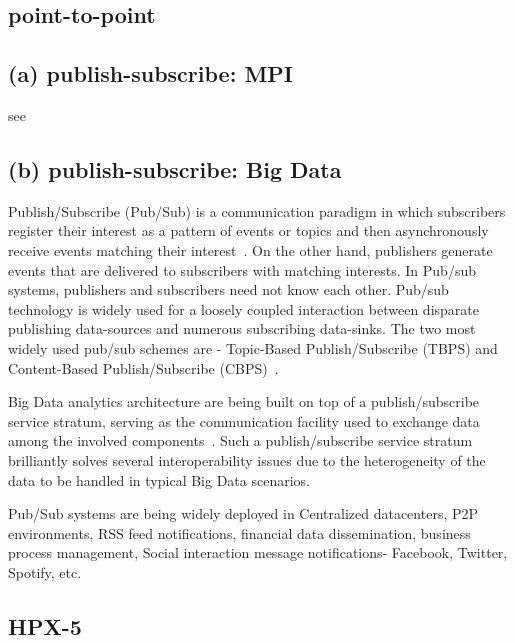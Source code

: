 \subsection{point-to-point}
\subsection{ (a) publish-subscribe: MPI \cv}

     see 
     
\subsection{ (b) publish-subscribe: Big Data}

Publish/Subscribe (Pub/Sub) is a communication paradigm in which
subscribers register their interest as a pattern of events or topics
and then asynchronously receive events matching their
interest~\cite{thesis-pub-sub}.  On the other hand, publishers
generate events that are delivered to subscribers with matching
interests.  In Pub/sub systems, publishers and subscribers need not
know each other. Pub/sub technology is widely used for a loosely
coupled interaction between disparate publishing data-sources and
numerous subscribing data-sinks. The two most widely used pub/sub
schemes are - Topic-Based Publish/Subscribe (TBPS) and Content-Based
Publish/Subscribe (CBPS)~\cite{paper-pub-sub}.
      
Big Data analytics architecture are being built on top of a
publish/subscribe service stratum, serving as the communication
facility used to exchange data among the involved
components~\cite{paper-pub-sub-bigdata}. Such a publish/subscribe
service stratum brilliantly solves several interoperability issues due
to the heterogeneity of the data to be handled in typical Big Data
scenarios.

     Pub/Sub systems are being widely deployed in Centralized
     datacenters, P2P environments, RSS feed notifications, financial
     data dissemination, business process management, Social
     interaction message notifications- Facebook, Twitter, Spotify,
     etc.

     \pv

\subsection{HPX-5}

